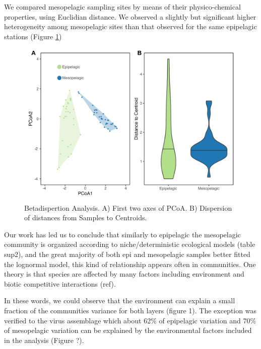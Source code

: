 \documentclass[fleqn,10pt]{wlscirep}
\begin{document}
We compared mesopelagic sampling sites by means of their physico-chemical properties, using Euclidian distance. We observed a slightly but significant higher heterogeneity among mesopelagic sites than that observed for the same epipelagic stations (Figure \ref{fig:betadipersion})

\begin{figure}[ht]
    \centering
    \includegraphics[scale=0.5]{images/betadisp_diganose_to_print.pdf}
    \caption{Betadispertion Analysis. A) First two axes of PCoA. B) Dispersion of distances from Samples to Centroids.}
    \label{fig:betadipersion}
\end{figure}

Our work has led us to conclude that similarly to epipelagic the mesopelagic community is organized according to niche/deterministic ecological models (table sup2), and the great majority of both epi and mesopelagic samples better fitted the lognormal model, this kind of relationship appears often in communities. One theory is that species are affected by many factors including environment and biotic competitive interactions (ref). 

In these words, we could observe that the environment can explain a small fraction of the communities variance for both layers (figure 1). The exception was verified to the virus assemblage which about 62\% of epipelagic variation and 70\% of mesopelagic variation can be explained by the environmental factors included in the analysis (Figure ?). 
\end{document}
